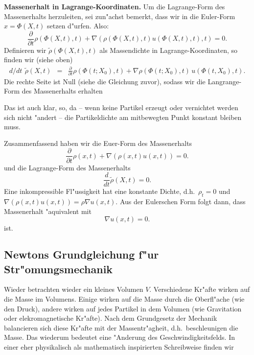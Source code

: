 {\bf Massenerhalt in Lagrange-Koordinaten.} Um die Lagrange-Form des Massenerhalts 
herzuleiten, sei zun"achst bemerkt, dass 
wir in die Euler-Form $x=\Phi(X,t)$ setzen d"urfen. Also:
$$
 \frac{\partial}{\partial t}\rho(\Phi(X,t),t)  
+ \nabla(\rho(\Phi(X,t),t) u(\Phi(X,t),t),t) = 0. 
$$
Definieren wir $\tilde\rho(\Phi(X,t),t)$ 
als Massendichte in Lagrange-Koordinaten, so 
finden wir (siehe oben) 
\begin{eqnarray*}
d/dt\,\ \tilde \rho(X,t) & = & \frac{\partial}{\partial t}\rho(\Phi(t;X_0),t)+
\nabla \rho(\Phi(t;X_0),t) \, u(\Phi(t,X_0), t).
\end{eqnarray*}
Die rechte Seite ist Null (siehe die Gleichung zuvor), sodass wir die
Langrange-Form des Massenerhalts erhalten\par
{}
Das ist auch klar, so, da -- wenn keine Partikel erzeugt oder vernichtet werden 
sich nicht "andert -- die Partikeldichte am mitbewegten Punkt konstant bleiben muss.
\begin{sbem} Zusammenfassend haben wir die Euer-Form des Massenerhalts
$$ \frac{\partial}{\partial t}\rho(x,t)  + \nabla(\rho(x,t) u(x,t)) = 0. $$
und die Lagrange-Form des Massenerhalts
$$ \frac d {dt}\tilde\rho(X,t) = 0.$$
Eine inkompressible Fl"ussigkeit hat eine konstante Dichte, 
d.h.\ $\rho_t=0$ und 
$\nabla(\rho(x,t) u(x,t)) = \rho\nabla u(x,t)$. Aus der Eulerschen Form folgt 
dann, dass Massenerhalt "aquivalent mit
$$ \nabla u(x,t) = 0.$$
ist.
\end{sbem}
\subsection{Newtons Grundgleichung f"ur Str"omungsmechanik} 

Wieder betrachten wieder ein kleines Volumen $V$. Verschiedene Kr"afte
wirken auf die Masse im Volumens. Einige wirken auf die Masse durch die
Oberfl"ache (wie den Druck), andere wirken auf jedes Partikel in dem Volumen
(wie Gravitation oder elekromagnetische Kr"afte). Nach dem Grundgesetz der 
Mechanik balancieren sich diese Kr"afte mit der Massentr"agheit, d.h.\ 
beschleunigen die Masse. Das wiederum bedeutet eine "Anderung des 
Geschwindigkeitsfelds. In einer eher physikalisch als 
mathematisch inspirierten Schreibweise finden wir

